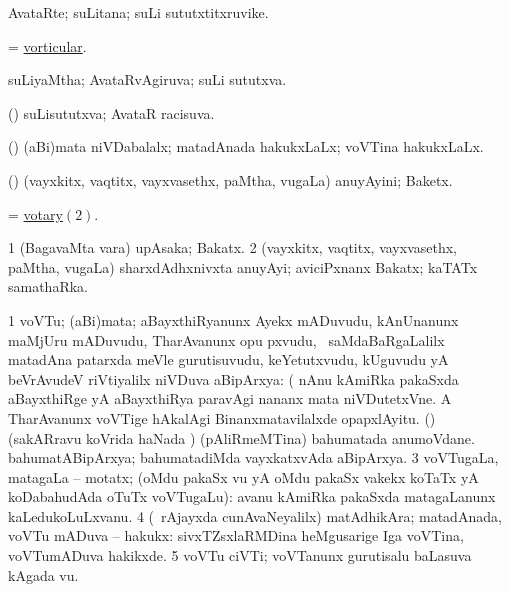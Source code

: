 \bentry 
{} 
\gl{\nA}
\expl{}
\bmng
 AvataRte; suLitana; suLi sututxtitxruvike. 
\emng
\eentry

\bentry 
{} 
\gl{\gu}
\expl{}
\bmng
 = \hyperlink{vorticular}{vorticular}. 
\emng
\eentry

\bentry 
{} 
\gl{\gu}
\expl{}
\bmng
 suLiyaMtha; AvataRvAgiruva; suLi sututxva. 
\emng
\eentry

\bentry
{} 
\gl{\gu}
\expl{}
\bmng
 (\pArxparx) suLisututxva; AvataR racisuva. 
\emng
\eentry

\bentry 
{} 
\gl{\gu}
\expl{}
\bmng
 (\viparx) (aBi)mata niVDabalalx; matadAnada hakukxLaLx; voVTina hakukxLaLx. 
\emng
\eentry

\bentry
{} 
\gl{\nA}
\expl{}
\bmng
 (\sitxrXV) (vayxkitx, vaqtitx, vayxvasethx, paMtha, \mo vugaLa) anuyAyini; Baketx. 
\emng
\eentry

\bentry 
{} 
\gl{\nA}
\expl{}
\bmng
 = \hyperlink{votary(2)}{votary\((2)\)}. 
\emng
\eentry

\bentry 
{} 
\gl{\nA}
\bmng
\bnum
\num{1} (BagavaMta \mo vara) upAsaka; Bakatx. 
\hypertarget{votary(2)}{} 
\num{2} (vayxkitx, vaqtitx, vayxvasethx, paMtha, \mo vugaLa) sharxdAdhxnivxta anuyAyi; aviciPxnanx Bakatx; kaTATx samathaRka. 
\enum
\emng
\eentry

\bentry
{} 
\gl{\nA}
\expl{}
\bmng
\bnum
\num{1} voVTu; (aBi)mata; aBayxthiRyanunx Ayekx mADuvudu, kAnUnanunx maMjUru mADuvudu, TharAvanunx opu pxvudu, \mo\ saMdaBaRgaLalilx matadAna patarxda meVle gurutisuvudu, keYetutxvudu, kUguvudu yA beVrAvudeV riVtiyalilx niVDuva aBipArxya:  (  nAnu kAmiRka pakaSxda aBayxthiRge yA aBayxthiRya paravAgi nananx mata niVDutetxVne.  A TharAvanunx voVTige hAkalAgi Binanxmatavilalxde opapxlAyitu. 
 (\birx) 
\banum
{} (sakARravu koVrida haNada \vi) (pAliRmeMTina) bahumatada anumoVdane. 
 bahumatABipArxya; bahumatadiMda vayxkatxvAda aBipArxya. 
\eanum
\numie
\num{3} voVTugaLa, matagaLa -- motatx; (oMdu pakaSx \mo vu yA oMdu pakaSx \mo vakekx koTaTx yA koDabahudAda oTuTx voVTugaLu):  avanu kAmiRka pakaSxda matagaLanunx kaLedukoLuLxvanu. 
\num{4} (\kanmu\ rAjayxda cunAvaNeyalilx) matAdhikAra; matadAnada, voVTu mADuva -- hakukx:  sivxTZsxlaRMDina heMgusarige Iga voVTina, voVTumADuva hakikxde. 
\num{5} voVTu ciVTi; voVTanunx gurutisalu baLasuva kAgada \mo vu. 
\enum
\emng

